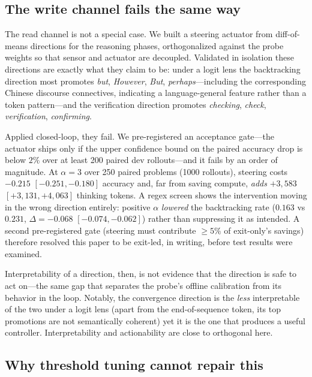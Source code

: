 \subsection{The write channel fails the same way}
\label{sec:steer}

The read channel is not a special case. We built a steering actuator from
diff-of-means directions for the reasoning phases, orthogonalized against the
probe weights so that sensor and actuator are decoupled. Validated in
isolation these directions are exactly what they claim to be: under a logit
lens the backtracking direction most promotes \emph{but}, \emph{However},
\emph{But}, \emph{perhaps}---including the corresponding Chinese discourse
connectives, indicating a language-general feature rather than a token
pattern---and the verification direction promotes \emph{checking},
\emph{check}, \emph{verification}, \emph{confirming}.

Applied closed-loop, they fail. We pre-registered an acceptance gate---the
actuator ships only if the upper confidence bound on the paired accuracy drop
is below $2\%$ over at least 200 paired dev rollouts---and it fails by an
order of magnitude. At $\alpha{=}3$ over 250 paired problems (1000 rollouts),
steering costs $-0.215$ $[-0.251,-0.180]$ accuracy and, far from saving
compute, \emph{adds} $+3{,}583$ $[+3{,}131,+4{,}063]$ thinking tokens. A
regex screen shows the intervention moving in the wrong direction entirely:
positive $\alpha$ \emph{lowered} the backtracking rate ($0.163$ vs $0.231$,
$\Delta = -0.068$ $[-0.074,-0.062]$) rather than suppressing it as intended.
A second pre-registered gate (steering must contribute $\ge 5\%$ of
exit-only's savings) therefore resolved this paper to be exit-led, in writing,
before test results were examined.

Interpretability of a direction, then, is not evidence that the direction is
safe to act on---the same gap that separates the probe's offline calibration
from its behavior in the loop. Notably, the convergence direction is the
\emph{less} interpretable of the two under a logit lens (apart from the
end-of-sequence token, its top promotions are not semantically coherent) yet
it is the one that produces a useful controller. Interpretability and
actionability are close to orthogonal here.

\subsection{Why threshold tuning cannot repair this}
\label{sec:whynot}

